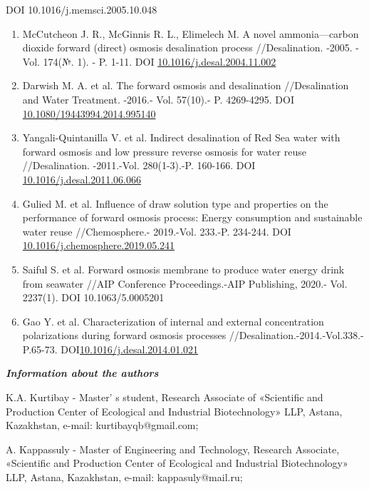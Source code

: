 DOI 10.1016/j.memsci.2005.10.048

\begin{enumerate}
\def\labelenumi{\arabic{enumi}.}
\setcounter{enumi}{13}
\item
  McCutcheon J. R., McGinnis R. L., Elimelech M. A novel
  ammonia---carbon dioxide forward (direct) osmosis desalination process
  //Desalination. -2005. - Vol. 174(№. 1). - P. 1-11. DOI
  \href{http://dx.doi.org/10.1016/j.desal.2004.11.002}{10.1016/j.desal.2004.11.002}
\item
  Darwish M. A. et al. The forward osmosis and desalination
  //Desalination and Water Treatment. -2016.- Vol. 57(10).- P.
  4269-4295. DOI
  \href{http://dx.doi.org/10.1080/19443994.2014.995140}{10.1080/19443994.2014.995140}
\item
  Yangali-Quintanilla V. et al. Indirect desalination of Red Sea water
  with forward osmosis and low pressure reverse osmosis for water reuse
  //Desalination. -2011.-Vol. 280(1-3).-P. 160-166. DOI
  \href{http://dx.doi.org/10.1016/j.desal.2011.06.066}{10.1016/j.desal.2011.06.066}
\item
  Gulied M. et al. Influence of draw solution type and properties on the
  performance of forward osmosis process: Energy consumption and
  sustainable water reuse //Chemosphere.- 2019.-Vol. 233.-P. 234-244.
  DOI
  \href{http://dx.doi.org/10.1016/j.chemosphere.2019.05.241}{10.1016/j.chemosphere.2019.05.241}
\item
  Saiful S. et al. Forward osmosis membrane to produce water energy
  drink from seawater //AIP Conference Proceedings.-AIP Publishing,
  2020.- Vol. 2237(1). DOI 10.1063/5.0005201
\item
  Gao Y. et al. Characterization of internal and external concentration
  polarizations during forward osmosis processes
  //Desalination.-2014.-Vol.338.- P.65-73.
  DOI\href{http://dx.doi.org/10.1016/j.desal.2014.01.021}{10.1016/j.desal.2014.01.021}
\end{enumerate}

\emph{{\bfseries Information about the authors}}

K.A. Kurtibay - Master' s student, Research Associate of
«Scientific and Production Center of Ecological and Industrial
Biotechnology» LLP, Astana, Kazakhstan, e-mail: kurtibayqb@gmail.com;

A. Kappassuly - Master of Engineering and Technology, Research
Associate, «Scientific and Production Center of Ecological and
Industrial Biotechnology» LLP, Astana, Kazakhstan, e-mail:
kappasuly@mail.ru;

